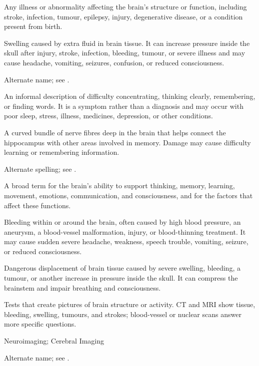  Any illness or abnormality affecting the brain's structure or function, including stroke, infection, tumour, epilepsy, injury, degenerative disease, or a condition present from birth.

 Swelling caused by extra fluid in brain tissue. It can increase pressure inside the skull after injury, stroke, infection, bleeding, tumour, or severe illness and may cause headache, vomiting, seizures, confusion, or reduced consciousness.

 Alternate name; see .

 An informal description of difficulty concentrating, thinking clearly, remembering, or finding words. It is a symptom rather than a diagnosis and may occur with poor sleep, stress, illness, medicines, depression, or other conditions.

 A curved bundle of nerve fibres deep in the brain that helps connect the hippocampus with other areas involved in memory. Damage may cause difficulty learning or remembering information.

 Alternate spelling; see .

 A broad term for the brain's ability to support thinking, memory, learning, movement, emotions, communication, and consciousness, and for the factors that affect these functions.

 Bleeding within or around the brain, often caused by high blood pressure, an aneurysm, a blood-vessel malformation, injury, or blood-thinning treatment. It may cause sudden severe headache, weakness, speech trouble, vomiting, seizure, or reduced consciousness.

 Dangerous displacement of brain tissue caused by severe swelling, bleeding, a tumour, or another increase in pressure inside the skull. It can compress the brainstem and impair breathing and consciousness.

 Tests that create pictures of brain structure or activity. CT and MRI show tissue, bleeding, swelling, tumours, and strokes; blood-vessel or nuclear scans answer more specific questions.

\synonyms
Neuroimaging; Cerebral Imaging

 Alternate name; see .

